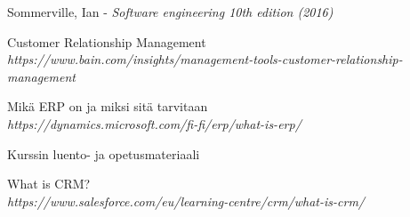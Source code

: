 \begin{thebibliography}{9}

 Sommerville, Ian - \textit{Software engineering 10th edition (2016)}

Customer Relationship Management
\\\textit{https://www.bain.com/insights/management-tools-customer-relationship-management}

Mikä ERP on ja miksi sitä tarvitaan
\\\textit{https://dynamics.microsoft.com/fi-fi/erp/what-is-erp/}

Kurssin luento- ja opetusmateriaali

What is CRM?
\\\textit{https://www.salesforce.com/eu/learning-centre/crm/what-is-crm/}

\end{thebibliography}
